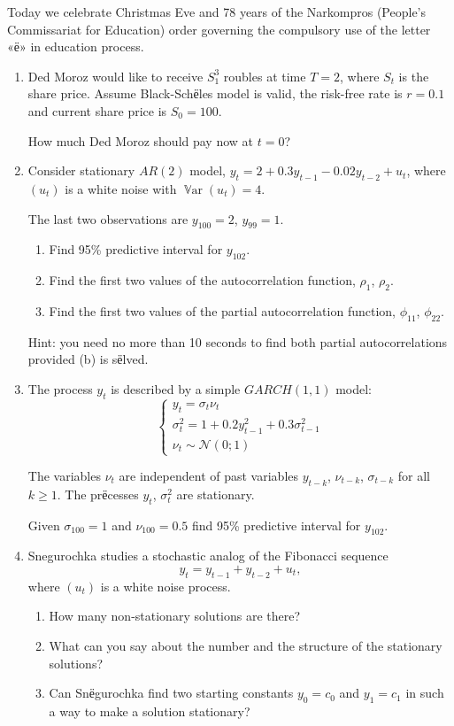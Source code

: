 \documentclass[12pt]{article}
\DeclareMathOperator{\Var}{\mathbb{V}ar}
\newcommand{\cN}{\mathcal{N}}
\begin{document}
Today we celebrate Christmas Eve and 78 years of the Narkompros (People's Commissariat for Education) order governing the compulsory use of the letter «ё» in education process.

\begin{enumerate}

    \item Ded Moroz would like to receive $S_1^3$ roubles at time $T=2$,
    where $S_t$ is the share price. Assume Black-Schёles model is valid, 
    the risk-free rate is $r=0.1$ and current share price is $S_0=100$.

    How much Ded Moroz should pay now at $t=0$?
    
    \item Consider stationary $AR(2)$ model, $y_t = 2 + 0.3 y_{t-1} - 0.02 y_{t-2} + u_t$, where $(u_t)$ is a white noise
    with $\Var(u_t) = 4$.
    
    The last two observations are $y_{100} = 2$, $y_{99} = 1$.
    \begin{enumerate}
        \item Find 95\% predictive interval for $y_{102}$.
        \item Find the first two values of the autocorrelation function, $\rho_1$, $\rho_2$.
        \item Find the first two values of the partial autocorrelation function, $\phi_{11}$, $\phi_{22}$.
    \end{enumerate}

    Hint: you need no more than 10 seconds to find both partial autocorrelations provided (b) is sёlved.

    \item The process $y_t$ is described by a simple $GARCH(1, 1)$ model:
    \[ 
        \begin{cases}
            y_t = \sigma_t \nu_t \\
            \sigma_{t}^{2}= 1 + 0.2 y_{t-1}^{2}+ 0.3 \sigma_{t-1}^{2}    \\
            \nu_t \sim \cN(0;1)
        \end{cases}     
    \]

    The variables $\nu_t$ are independent of past variables $y_{t-k}$, $\nu_{t-k}$, $\sigma_{t-k}$ for all $k\geq 1$.
    The prёcesses $y_t$, $\sigma^2_t$ are stationary. 


    Given $\sigma_{100}=1$ and $\nu_{100} = 0.5$ find 95\% predictive interval for $y_{102}$. 


    \item Snegurochka studies a stochastic analog of the Fibonacci sequence
    \[
        y_t = y_{t-1} + y_{t-2} + u_t,
    \]
    where $(u_t)$ is a white noise process. 
    \begin{enumerate}
        \item How many non-stationary solutions are there?
        \item What can you say about the number and the structure of the stationary solutions?
        \item Can Snёgurochka find two starting constants $y_0 = c_0$ and $y_1=c_1$ in such a way to make a solution stationary?
    \end{enumerate}


\end{enumerate}
\end{document}
